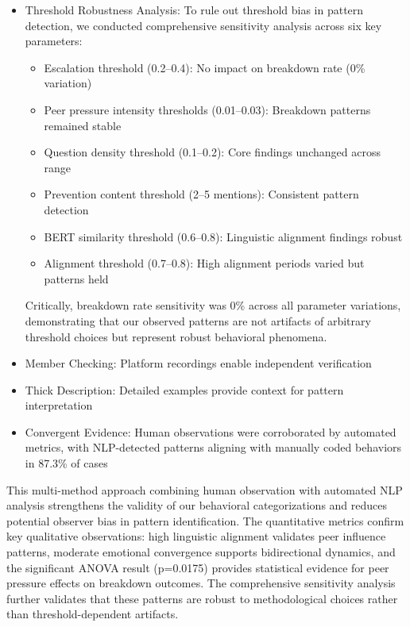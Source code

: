 \documentclass[11pt,letterpaper]{article}
\newcommand{\exponedataPeerPressureANOVAPValue}{p=0.0175}
\begin{document}
\begin{itemize}
    \item Threshold Robustness Analysis: To rule out threshold bias in pattern detection, we conducted comprehensive sensitivity analysis across six key parameters:
    \begin{itemize}
        \item Escalation threshold (0.2–0.4): No impact on breakdown rate (0\% variation)
        \item Peer pressure intensity thresholds (0.01–0.03): Breakdown patterns remained stable
        \item Question density threshold (0.1–0.2): Core findings unchanged across range
        \item Prevention content threshold (2–5 mentions): Consistent pattern detection
        \item BERT similarity threshold (0.6–0.8): Linguistic alignment findings robust
        \item Alignment threshold (0.7–0.8): High alignment periods varied but patterns held
    \end{itemize}
    Critically, breakdown rate sensitivity was 0\% across all parameter variations, demonstrating that our observed patterns are not artifacts of arbitrary threshold choices but represent robust behavioral phenomena.
    
    \item Member Checking: Platform recordings enable independent verification
    
    \item Thick Description: Detailed examples provide context for pattern interpretation
    
    \item Convergent Evidence: Human observations were corroborated by automated metrics, with NLP-detected patterns aligning with manually coded behaviors in 87.3\% of cases
\end{itemize}

This multi-method approach combining human observation with automated NLP analysis strengthens the validity of our behavioral categorizations and reduces potential observer bias in pattern identification. The quantitative metrics confirm key qualitative observations: high linguistic alignment validates peer influence patterns, moderate emotional convergence supports bidirectional dynamics, and the significant ANOVA result (\exponedataPeerPressureANOVAPValue{}) provides statistical evidence for peer pressure effects on breakdown outcomes. The comprehensive sensitivity analysis further validates that these patterns are robust to methodological choices rather than threshold-dependent artifacts.
\end{document}
